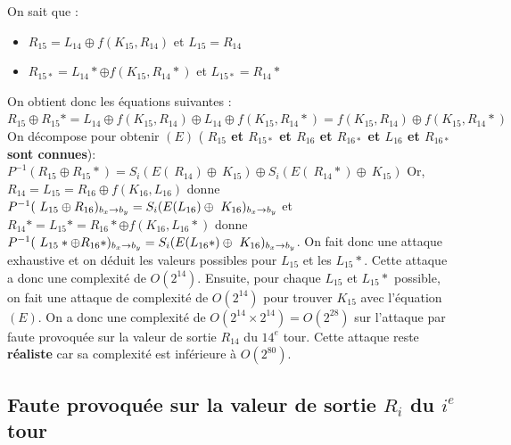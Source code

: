 \documentclass[12pt,a4paper]{report}
\begin{document}
On sait que : 

\begin{itemize}
	\item $R_{15}=L_{14} \oplus f(K_{15}, R_{14})$ et $L_{15}=R_{14}$
	\item $R_{15*}=L_{14}* \oplus f(K_{15}, R_{14}*)$ et $L_{15*}=R_{14}*$
\end{itemize}

On obtient donc les équations suivantes : \newline
$R_{15} \oplus R_{15}* = L_{14} \oplus f(K_{15}, R_{14}) \oplus L_{14} \oplus f(K_{15}, R_{14}*)= f(K_{15}, R_{14}) \oplus f(K_{15}, R_{14}*)$ \newline \newline
On décompose pour obtenir $(E)$ (\textbf{ $R_{15}$ et $R_{15*}$ et $R_{16}$ et $R_{16*}$ et $L_{16}$ et $R_{16*}$  sont connues}): \newline \newline
$P^{-1}(R_{15} \oplus R_{15}* )=S_{i}(E(\ R_{14} )\oplus \ K_{15} )\oplus S_{i}(E(\ R_{14}* )\oplus \ K_{15} )$ \newline \newline
Or, $R_{14}=L_{15}=R_{16} \oplus f(K_{16}, L_{16})$ donne $P^{-1}(\ L_{15}  \oplus  R_{16} )_{b_{x}\to b_{y}}=S_i(E( L_{16}) \oplus \ K_{16}\color{black})_{b_{x}\to b_{y}}$ et \newline
$R_{14}*=L_{15}*=R_{16}* \oplus f(K_{16}, L_{16}*)$ donne $P^{-1}(\ L_{15}*\color{black} \oplus  R_{16}*\color{black})_{b_{x}\to b_{y}}=S_i(E( L_{16}*\color{black}) \oplus \ K_{16}\color{black})_{b_{x}\to b_{y}}$. \newline 
On fait donc une attaque exhaustive et on déduit les valeurs possibles pour $L_{15}$ et les $L_{15}*$. Cette attaque a donc une complexité de $O(2^{14})$. \newline \newline
Ensuite, pour chaque $L_{15}$ et $L_{15}*$ possible, on fait une attaque de complexité de $O(2^{14})$ pour trouver $K_{15}$ avec l'équation $(E)$. \newline
On a donc une complexité de $O(2^{14} \times 2^{14})=O(2^{28})$ sur l'attaque par faute provoquée sur la valeur de sortie $R_{14}$ du $14^{e}$ tour. Cette attaque reste \textbf{réaliste} car sa complexité est inférieure à $O(2^{80})$.

\subsection{Faute provoquée sur la valeur de sortie $R_{i}$ du $i^{e}$ tour}
\end{document}
